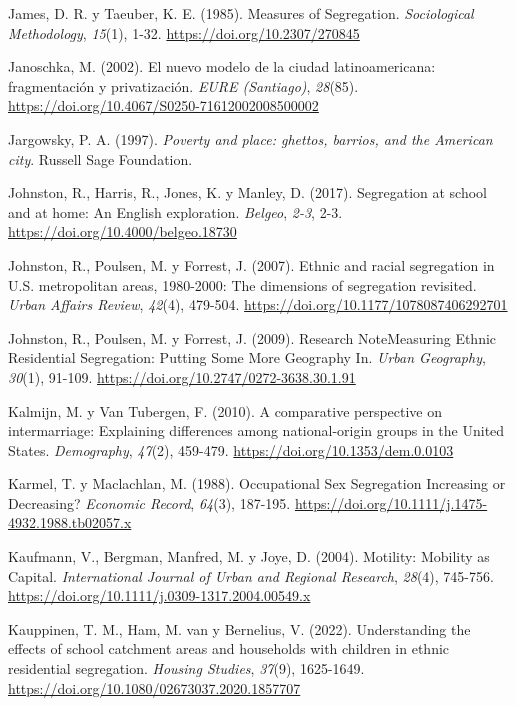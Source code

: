 \documentclass[
  spanish,
  a4paper,%
  chapterprefix=true,%
  DIV=calc,%
  twoside]{scrbook}%
\newlength{\cslhangindent}
\newenvironment{CSLReferences}[2] %
 {\begin{list}{}{%
  \setlength{\itemindent}{0pt}
  \setlength{\leftmargin}{0pt}
  \setlength{\parsep}{0pt}
  \ifodd #1
   \setlength{\leftmargin}{\cslhangindent}
   \setlength{\itemindent}{-1\cslhangindent}
  \fi
  \setlength{\itemsep}{#2\baselineskip}}}
 {\end{list}}
\begin{document}
\begin{CSLReferences}{1}{0}
James, D. R. y Taeuber, K. E. (1985). Measures of Segregation. \emph{Sociological Methodology}, \emph{15}(1), 1-32. \url{https://doi.org/10.2307/270845}

Janoschka, M. (2002). El nuevo modelo de la ciudad latinoamericana: fragmentación y privatización. \emph{EURE (Santiago)}, \emph{28}(85). \url{https://doi.org/10.4067/S0250-71612002008500002}

Jargowsky, P. A. (1997). \emph{Poverty and place: ghettos, barrios, and the American city}. Russell Sage Foundation.

Johnston, R., Harris, R., Jones, K. y Manley, D. (2017). Segregation at school and at home: An English exploration. \emph{Belgeo}, \emph{2-3}, 2-3. \url{https://doi.org/10.4000/belgeo.18730}

Johnston, R., Poulsen, M. y Forrest, J. (2007). Ethnic and racial segregation in U.S. metropolitan areas, 1980-2000: The dimensions of segregation revisited. \emph{Urban Affairs Review}, \emph{42}(4), 479-504. \url{https://doi.org/10.1177/1078087406292701}

Johnston, R., Poulsen, M. y Forrest, J. (2009). Research Note{\textemdash}Measuring Ethnic Residential Segregation: Putting Some More Geography In. \emph{Urban Geography}, \emph{30}(1), 91-109. \url{https://doi.org/10.2747/0272-3638.30.1.91}

Kalmijn, M. y Van Tubergen, F. (2010). A comparative perspective on intermarriage: Explaining differences among national-origin groups in the United States. \emph{Demography}, \emph{47}(2), 459-479. \url{https://doi.org/10.1353/dem.0.0103}

Karmel, T. y Maclachlan, M. (1988). Occupational Sex Segregation {\textemdash}Increasing or Decreasing? \emph{Economic Record}, \emph{64}(3), 187-195. \url{https://doi.org/10.1111/j.1475-4932.1988.tb02057.x}

Kaufmann, V., Bergman, Manfred, M. y Joye, D. (2004). Motility: Mobility as Capital. \emph{International Journal of Urban and Regional Research}, \emph{28}(4), 745-756. \url{https://doi.org/10.1111/j.0309-1317.2004.00549.x}

Kauppinen, T. M., Ham, M. van y Bernelius, V. (2022). Understanding the effects of school catchment areas and households with children in ethnic residential segregation. \emph{Housing Studies}, \emph{37}(9), 1625-1649. \url{https://doi.org/10.1080/02673037.2020.1857707}


\end{CSLReferences}
\end{document}
